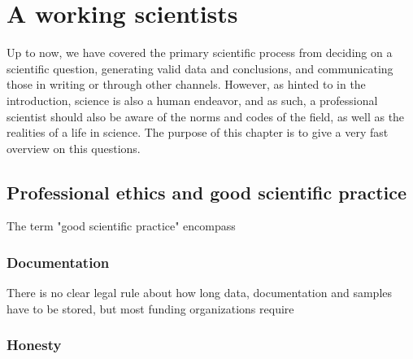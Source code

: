 \documentclass{tufte-book}
\begin{document}
\chapter{A working scientists}

Up to now, we have covered the primary scientific process from deciding on a scientific question, generating valid data and conclusions, and communicating those in writing or through other channels. However, as hinted to in the introduction, science is also a human endeavor, and as such, a professional scientist should also be aware of the norms and codes of the field, as well as the realities of a life in science. The purpose of this chapter is to give a very fast overview on this questions.

\section{Professional ethics and good scientific practice}

The term "good scientific practice" encompass

\citep{Forschungsgemeinschaft-RulesGoodScientific-2013}



\subsection{Documentation}


There is no clear legal rule about how long data, documentation and samples have to be stored, but most funding organizations require 



\subsection{Honesty}






\end{document}
